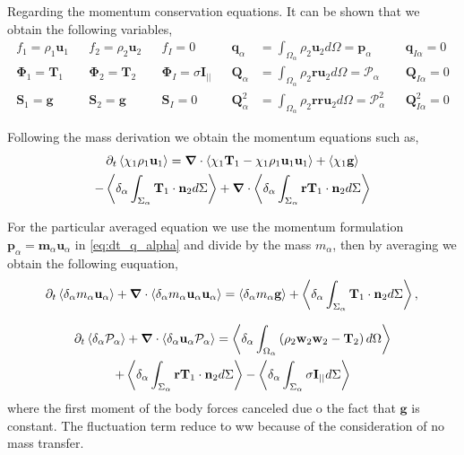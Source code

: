 Regarding the momentum conservation equations. 
It can be shown that we obtain the following variables, 
\begin{align*}
    f_1 = \rho_1 \textbf{u}_1          
    && f_2 =  \rho_2 \textbf{u}_2
    && f_I =  0
    && \textbf{q}_\alpha &= \int_{\Omega_\alpha} \rho_2 \textbf{u}_2  d\Omega = \textbf{p}_\alpha
    && \textbf{q}_{I\alpha} = 0\\
    \mathbf{\Phi}_1 = \textbf{T}_1
    &&     \mathbf{\Phi}_2  =  \textbf{T}_2
    &&     \mathbf{\Phi}_I  =  \sigma \textbf{I}_{||}        
    && \textbf{Q}_\alpha &= \int_{\Omega_\alpha} \rho_2 \textbf{r} \textbf{u}_2 d\Omega = \mathcal{P}_\alpha
    && \textbf{Q}_{I\alpha} = 0\\
    \textbf{S}_1 = \textbf{g}       
    &&      \textbf{S}_2    =  \textbf{g}         
    &&      \textbf{S}_I    =  0         
    && \textbf{Q}^2_\alpha &= \int_{\Omega_\alpha} \rho_2 \textbf{rru}_2   d\Omega = \mathcal{P}_\alpha^2
    && \textbf{Q}^2_{I\alpha} = 0
\end{align*} 

Following the mass derivation we obtain the momentum equations such as, 
\begin{multline}
    \partial_t \left<\chi_1 \rho_1\textbf{u}_1\right>
    = \bm{\nabla} \cdot \left<\chi_1 \textbf{T}_1 - \chi_1 \rho_1\textbf{u}_1 \textbf{u}_1\right>
    + \left<\chi_1 \textbf{g}\right>\\
    - \left<\delta_\alpha \int_{\Sigma_\alpha}
        \mathbf{T}_1
    \cdot \textbf{n}_2d\Sigma\right> 
    +  \bm{\nabla} \cdot \left<\delta_\alpha \int_{\Sigma_\alpha} \textbf{r}
        \mathbf{T}_1
    \cdot \textbf{n}_2d\Sigma\right> 
    \label{eq:hybrid_avg_dt_chif}
\end{multline}

For the particular averaged equation we use the momentum formulation $\textbf{p}_\alpha = \textbf{m}_\alpha \textbf{u}_\alpha$ in \ref{eq:dt_q_alpha} and divide by the mass $m_\alpha$, then by averaging we obtain the following euquation,
\begin{equation}
    \partial_t \left<\delta_\alpha m_\alpha\textbf{u}_\alpha\right>
    + \bm{\nabla} \cdot\left<\delta_\alpha m_\alpha \textbf{u}_\alpha \textbf{u}_\alpha \right>
    = \left<\delta_\alpha m_\alpha \textbf{g}\right>
    + \left<\delta_\alpha \int_{\Sigma_\alpha} \textbf{T}_1 \cdot \textbf{n}_2 d\Sigma\right>,
    \label{eq:hybrid_avg_dt_dp_alpha}\\
\end{equation}

\begin{multline}
    \partial_t \left<\delta_\alpha \mathcal{P}_\alpha\right>
    + \bm{\nabla}\cdot \left<\delta_\alpha   \textbf{u}_\alpha \mathcal{P}_\alpha\right>
    = \left<\delta_\alpha \int_{\Omega_\alpha} \left(
        \rho_2 \textbf{w}_2 \textbf{w}_2
        - \mathbf{T}_2
        \right) d\Omega\right>\\
        + \left<\delta_\alpha \int_{\Sigma_\alpha} \textbf{r}\textbf{T}_1 \cdot \textbf{n}_2d\Sigma\right>
    - \left<\delta_\alpha \int_{\Sigma_\alpha} \sigma \textbf{I}_{||} d\Sigma\right>
    \label{eq:hybrid_avg_dt_dP_alpha}
\end{multline}
where the first moment of the body forces canceled due o the fact that $\textbf{g}$ is constant. 
The fluctuation term reduce to ww because of the consideration of no mass transfer. 

